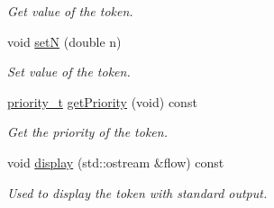 \begin{DoxyCompactItemize}
\begin{DoxyCompactList}\small\item\em Get value of the token. \end{DoxyCompactList}\item 
\hypertarget{class_token_a27e0713a82d278a603e4c430ff0204a3}{}void \hyperlink{class_token_a27e0713a82d278a603e4c430ff0204a3}{set\+N} (double n)\label{class_token_a27e0713a82d278a603e4c430ff0204a3}

\begin{DoxyCompactList}\small\item\em Set value of the token. \end{DoxyCompactList}\item 
\hypertarget{class_token_ac413c3cf2741f8807cf14815044c900f}{}\hyperlink{token_8h_acb95f02bc8aa11a54c8b4595158a3356}{priority\+\_\+t} \hyperlink{class_token_ac413c3cf2741f8807cf14815044c900f}{get\+Priority} (void) const \label{class_token_ac413c3cf2741f8807cf14815044c900f}

\begin{DoxyCompactList}\small\item\em Get the priority of the token. \end{DoxyCompactList}\item 
\hypertarget{class_token_a04cb002bc8a1ca11487fa254a4455bf9}{}void \hyperlink{class_token_a04cb002bc8a1ca11487fa254a4455bf9}{display} (std\+::ostream \&flow) const \label{class_token_a04cb002bc8a1ca11487fa254a4455bf9}

\begin{DoxyCompactList}\small\item\em Used to display the token with standard output. \end{DoxyCompactList}\end{DoxyCompactItemize}

